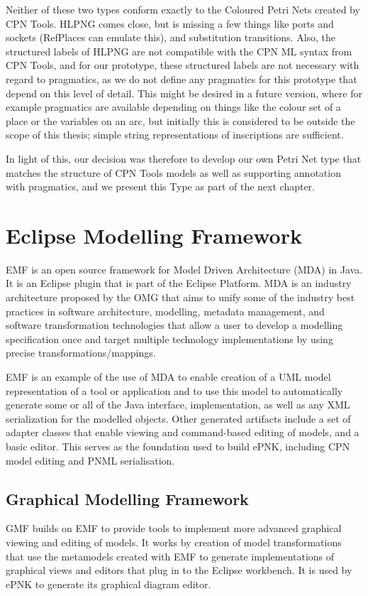 Neither of these two types conform exactly to the Coloured Petri Nets created by
CPN Tools. HLPNG comes close, but is missing a few things like ports and sockets
(RefPlaces can emulate this), and substitution transitions. Also, the
structured labels of HLPNG are not compatible with the CPN ML syntax from CPN
Tools, and for our prototype, these structured labels are not necessary with regard to
pragmatics, as we do not define any pragmatics for this prototype that depend on
this level of detail. This might be desired in a future version, where for
example  pragmatics are available depending on things like the colour set of a
place or the variables on an arc, but initially this is considered to be outside the
scope of this thesis; simple string representations of inscriptions are
sufficient.

In light of this, our decision was therefore to develop our own Petri Net type
that matches the structure of CPN Tools models as well as supporting annotation
with pragmatics, and we present this Type as part of the next chapter.

\section{Eclipse Modelling Framework}
EMF is an open source framework for Model Driven Architecture (MDA) in Java. It
is an Eclipse plugin that is part of the Eclipse Platform. MDA is an
industry architecture proposed by the OMG that aims to unify some of the
industry best practices in software architecture, modelling, metadata management,
and software transformation technologies that allow a user to develop a
modelling specification once and target multiple technology implementations by
using precise transformations/mappings. 

EMF is an example of the use of MDA to enable creation of a UML model
representation of a tool or application and to use this model to automatically
generate some or all of the Java interface, implementation, as well as any XML
serialization for the modelled objects.
Other generated artifacts include a set of adapter classes that enable
viewing and command-based editing of models, and a basic editor. This serves as
the foundation used to build ePNK, including CPN model editing and PNML
serialisation.

	\subsection{Graphical Modelling Framework}
	GMF builds on EMF to provide tools to implement more advanced graphical viewing
	and editing of models. It works by creation of model transformations that use
	the metamodels created with EMF to generate implementations of graphical views and
	editors that plug in to the Eclipse workbench. It is used by ePNK to generate
	its graphical diagram editor.
	
